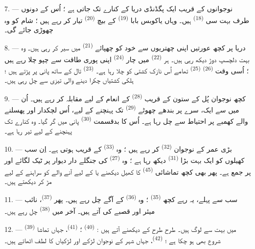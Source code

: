 7. --- نوجوانوں کے قریب ایک پگڈنڈی دریا کے کنارے تک جاتی ہے ؛ اُس کے
دونوں طرف بہت سی  \textsuperscript{(18)}
ہیں۔ وہاں یاکوبس بابا  \textsuperscript{(19)} کے بیچ
 \textsuperscript{(20)} تیار کر رہے ہیں ؛ شام کو وہ
چھوڑی جائے گی۔

\VUsaut{4.4mm}
\VUsaut{3.4mm}

8. --- دریا پر کچھ عورتیں اپنی چھتریوں سے خود کو چھپائے
 \textsuperscript{(21)} میں سیر کر رہی ہیں۔ وہ بہت دلچسپ
دوڑ دیکھ رہی ہیں۔ ہر  \textsuperscript{(22)} میں
چار  \textsuperscript{(24)} اپنی پوری طاقت سے چپو چلا
رہے ہیں ؛ اُسی وقت  \textsuperscript{(26)}
 \textsuperscript{(25)} تھامے اُس نازک کشتی کو چلا رہا
ہے۔  \textsuperscript{(23)} تال کے ساتھ پانی پر پڑتے ہیں ؛
ہلکی کشتیاں چکرا دینے والی تیزی سے چل رہی ہیں۔

9. --- کچھ نوجوان پُل کے ستون کے قریب 
\textsuperscript{(28)} کے انعام کے لیے مقابلہ کر رہے ہیں۔ اُن میں سے
ایک، سرے پر بندھے چھوٹے  \textsuperscript{(29)} تک
پہنچنے کے لیے، اُس لچکدار اور پھسلنے والے کھمبے پر احتیاط سے چل رہا
ہے۔ اُس کا بدقسمت  \textsuperscript{(30)} پانی میں گر
گیا۔ وہ کنارے تک پہنچنے کے لیے تیر رہا ہے۔

10. --- بڑی عمر کے نوجوان 
\textsuperscript{(32)} کر رہے ہیں ؛ وہ 
\textsuperscript{(33)} کے قریب ہوتی ہے۔ اِن سب کھیلوں کو ایک بہت بڑا
 \textsuperscript{(31)} دیکھ رہا ہے ؛ وہ 
\textsuperscript{(27)} کی جنگلے دار دیوار پر ٹیک لگائے اور
 پر جمع ہے۔ پھر بھی کچھ تماشائی  \textsuperscript{(45)} کا کھیل دیکھنے یا 
کے لیے آنے والے  کو سراہنے کے لیے مڑ کر دیکھتے
ہیں۔

11. --- سب سے پہلے، یہ رہے کچھ  \textsuperscript{(35)} ؛
وہ  \textsuperscript{(36)} کے آگے چل رہے ہیں۔ پھر
 \textsuperscript{(37)}، نائب میئر اور قصبے کی
 آتے ہیں۔ آخر میں 
\textsuperscript{(38)} چل رہے ہیں۔

\VUsaut{5.0mm}
\VUsaut{3.6mm}

12. ---  \textsuperscript{(39)} میں بہت سے لوگ
ہیں۔ طرح طرح کے  دیکھنے آتے ہیں :  \textsuperscript{(40)} ؛  \textsuperscript{(41)}،
جہاں تماشا شروع بھی ہو چکا ہے ؛ 
\textsuperscript{(42)}، جہاں شہر کے نوجوان لڑکے اور لڑکیاں
 کا لطف اٹھاتے ہیں۔

